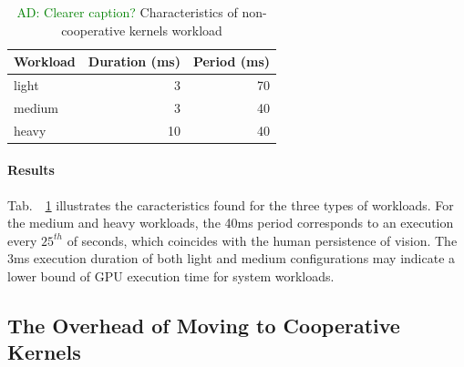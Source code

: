 \documentclass[numbers,nocopyrightspace,10pt]{sigplanconf}
\newcommand{\ADComment}[1]{\textcolor{green}{AD: #1}}
\newcommand{\mytab}{Tab.~}
\begin{document}
\begin{table}
\small
\centering
\begin{tabular}{ l r r }
Workload & Duration (ms) & Period (ms)\\
\hline
light & 3 & 70\\
medium & 3 & 40\\
heavy & 10 & 40\\
\end{tabular}
\caption{\ADComment{Clearer caption?} Characteristics of non-cooperative kernels workload}
\label{tab:noncooperativeworkload}
\end{table}

\paragraph{Results}
\mytab~\ref{tab:noncooperativeworkload} illustrates the caracteristics
found for the three types of workloads. For the medium and heavy
workloads, the 40ms period corresponds to an execution every $25^{th}$
of seconds, which coincides with the human persistence of vision. The
3ms execution duration of both light and medium configurations may
indicate a lower bound of GPU execution time for system workloads.

\subsection{The Overhead of Moving to Cooperative Kernels}\label{sec:overhead}

\end{document}

